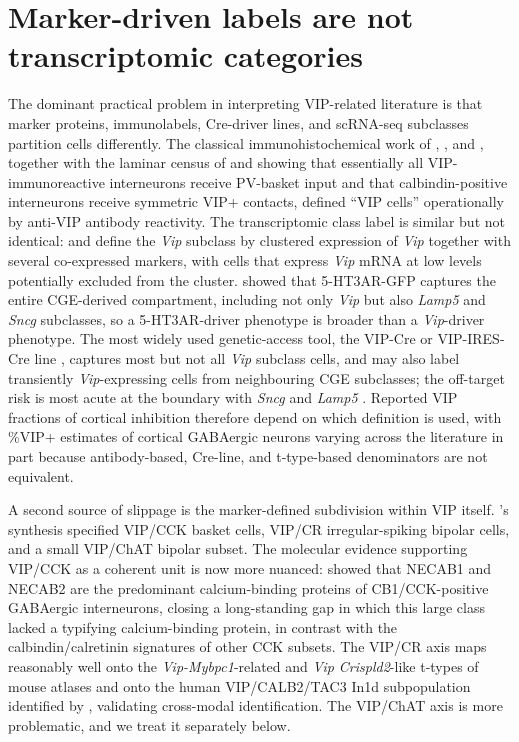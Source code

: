 \documentclass[11pt]{article}
\begin{document}
\section{Marker-driven labels are not transcriptomic categories}

The dominant practical problem in interpreting VIP-related literature is that marker proteins, immunolabels, Cre-driver lines, and scRNA-seq subclasses partition cells differently. The classical immunohistochemical work of \citet{Kawaguchi1996}, \citet{Kawaguchi1997a}, and \citet{Hajos1996}, together with the laminar census of \citet{Staiger1997} and \citet{Staiger2004} showing that essentially all VIP-immunoreactive interneurons receive PV-basket input and that calbindin-positive interneurons receive symmetric VIP+ contacts, defined ``VIP cells'' operationally by anti-VIP antibody reactivity. The transcriptomic class label is similar but not identical: \citet{Tasic2018} and \citet{Yao2021a} define the \textit{Vip} subclass by clustered expression of \textit{Vip} together with several co-expressed markers, with cells that express \textit{Vip} mRNA at low levels potentially excluded from the cluster. \citet{Lee2010} showed that 5-HT3AR-GFP captures the entire CGE-derived compartment, including not only \textit{Vip} but also \textit{Lamp5} and \textit{Sncg} subclasses, so a 5-HT3AR-driver phenotype is broader than a \textit{Vip}-driver phenotype. The most widely used genetic-access tool, the VIP-Cre or VIP-IRES-Cre line \citep{Tasic2018, Paul2017}, captures most but not all \textit{Vip} subclass cells, and may also label transiently \textit{Vip}-expressing cells from neighbouring CGE subclasses; the off-target risk is most acute at the boundary with \textit{Sncg} and \textit{Lamp5} \citep{Tasic2018, Yao2021a}. Reported VIP fractions of cortical inhibition therefore depend on which definition is used, with \%VIP+ estimates of cortical GABAergic neurons varying across the literature in part because antibody-based, Cre-line, and t-type-based denominators are not equivalent.

A second source of slippage is the marker-defined subdivision within VIP itself. \citet{Tremblay2016}'s synthesis specified VIP/CCK basket cells, VIP/CR irregular-spiking bipolar cells, and a small VIP/ChAT bipolar subset. The molecular evidence supporting VIP/CCK as a coherent unit is now more nuanced: \citet{Miczan2021} showed that NECAB1 and NECAB2 are the predominant calcium-binding proteins of CB1/CCK-positive GABAergic interneurons, closing a long-standing gap in which this large class lacked a typifying calcium-binding protein, in contrast with the calbindin/calretinin signatures of other CCK subsets. The VIP/CR axis maps reasonably well onto the \textit{Vip-Mybpc1}-related and \textit{Vip Crispld2}-like t-types of mouse atlases and onto the human VIP/CALB2/TAC3 In1d subpopulation identified by \citet{Lake2018}, validating cross-modal identification. The VIP/ChAT axis is more problematic, and we treat it separately below.
\end{document}
